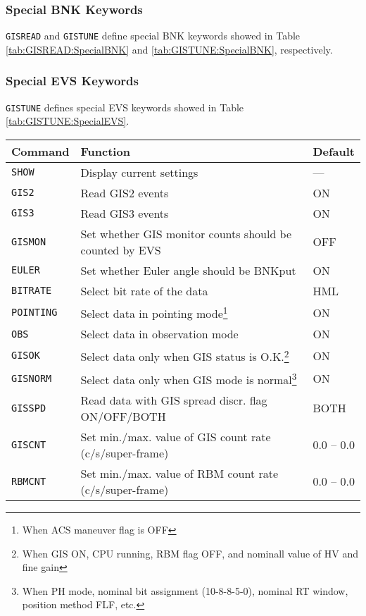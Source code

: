 \subsubsection{Special BNK Keywords}
{\tt GISREAD} and {\tt GISTUNE} define special BNK keywords
showed in Table \ref{tab:GISREAD:SpecialBNK} and
\ref{tab:GISTUNE:SpecialBNK}, respectively.

\subsubsection{Special EVS Keywords}
{\tt GISTUNE} defines special EVS keywords
showed in Table \ref{tab:GISTUNE:SpecialEVS}.

\begin{table}[htb]
\begin{minipage}{\textwidth}
\begin{center}
\begin{tabular}{|l|l|l|}
\hline
Command & Function & Default \\ \hline
{\tt SHOW}
	& Display current settings
	& --- \\
{\tt GIS2}
	& Read GIS2 events
	& ON \\
{\tt GIS3}
	& Read GIS3 events
	& ON \\
{\tt GISMON}
	& Set whether GIS monitor counts should be counted by EVS
	& OFF \\
{\tt EULER}
	& Set whether Euler angle should be BNKput
	& ON \\
{\tt BITRATE}
	& Select bit rate of the data
	& HML \\
{\tt POINTING}
	& Select data in pointing mode\footnote{
		When ACS maneuver flag is OFF}
	& ON \\
{\tt OBS}
	& Select data in observation mode
	& ON \\
{\tt GISOK}
	& Select data only when GIS status is O.K.\footnote{
		When GIS ON, CPU running, RBM flag OFF, 
		and nominall value of HV and fine gain}
	& ON \\
{\tt GISNORM}
	& Select data only when GIS mode is normal\footnote{
		When PH mode, nominal bit assignment (10-8-8-5-0),
		nominal RT window, position method FLF, etc.}
	& ON \\
{\tt GISSPD}
	& Read data with GIS spread discr. flag ON/OFF/BOTH
	& BOTH \\
{\tt GISCNT}
	& Set min./max. value of GIS count rate (c/s/super-frame)
	& 0.0 -- 0.0 \\
{\tt RBMCNT}
	& Set min./max. value of RBM count rate (c/s/super-frame)
	& 0.0 -- 0.0 \\

\end{tabular}
\end{center}
\end{minipage}
\end{table}
